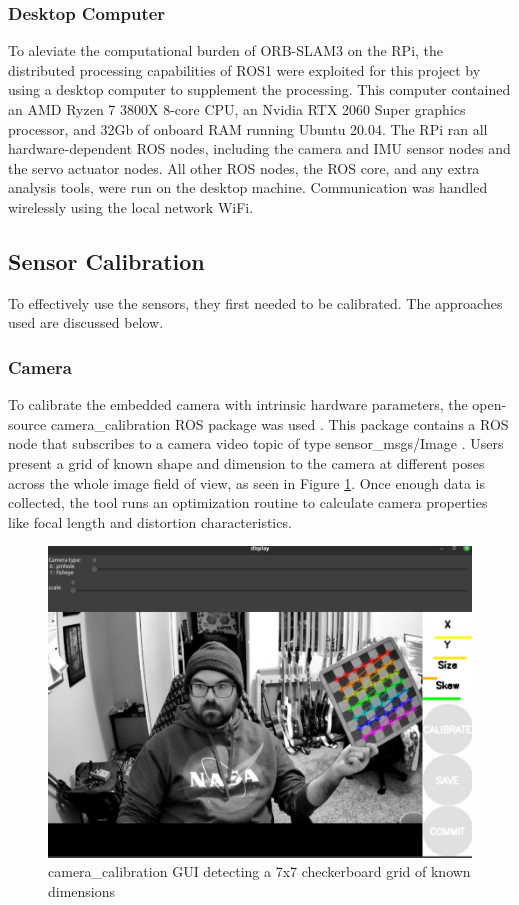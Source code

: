 \documentclass[twocolumn]{article}
\begin{document}
\subsubsection{ Desktop Computer }
To aleviate the computational burden of ORB-SLAM3 on the RPi, the distributed processing capabilities of ROS1 were exploited for this project by using a desktop computer to supplement the processing. This computer contained an AMD Ryzen 7 3800X 8-core CPU, an Nvidia RTX 2060 Super graphics processor, and 32Gb of onboard RAM running Ubuntu 20.04. The RPi ran all hardware-dependent ROS nodes, including the camera and IMU sensor nodes and the servo actuator nodes. All other ROS nodes, the ROS core, and any extra analysis tools, were run on the desktop machine. Communication was handled wirelessly using the local network WiFi.

\subsection{ Sensor Calibration }
To effectively use the sensors, they first needed to be calibrated. The approaches used are discussed below.

\subsubsection{ Camera }
To calibrate the embedded camera with intrinsic hardware parameters, the open-source camera\_calibration ROS package was used \cite{cameracalibration}. This package contains a ROS node that subscribes to a camera video topic of type sensor\_msgs/Image \cite{imagemsg}. Users present a grid of known shape and dimension to the camera at different poses across the whole image field of view, as seen in Figure \ref{fig:camera_calibrate}. Once enough data is collected, the tool runs an optimization routine to calculate camera properties like focal length and distortion characteristics.

\begin{figure}[H]
    \centerline{\includegraphics[scale=0.27]{figures/camera_calibrate.png}}
    \caption{ camera\_calibration GUI detecting a 7x7 checkerboard grid of known dimensions}
    \label{fig:camera_calibrate}
\end{figure}
\end{document}
